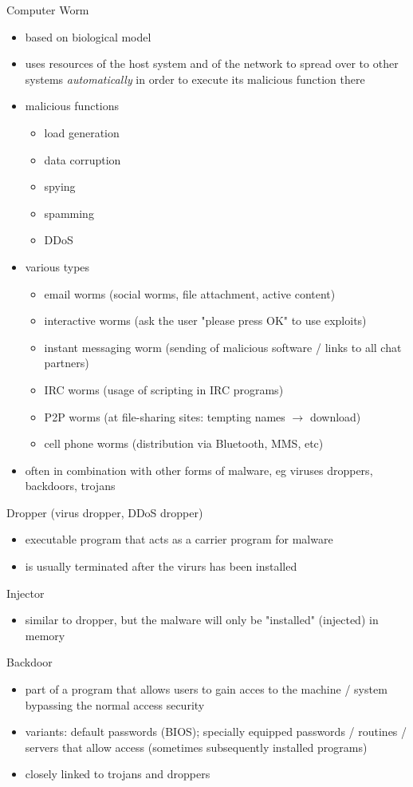 \documentclass[11pt]{article}
\begin{document}
Computer Worm
\begin{itemize}
\item based on biological model
\item uses resources of the host system and of the network to spread over to other systems \emph{automatically} in order to execute its malicious function there
\item malicious functions
\begin{itemize}
\item load generation
\item data corruption
\item spying
\item spamming
\item DDoS
\end{itemize}
\item various types
\begin{itemize}
\item email worms (social worms, file attachment, active content)
\item interactive worms (ask the user "please press OK" to use exploits)
\item instant messaging worm (sending of malicious software / links to all chat partners)
\item IRC worms (usage of scripting in IRC programs)
\item P2P worms (at file-sharing sites: tempting names \(\rightarrow\) download)
\item cell phone worms (distribution via Bluetooth, MMS, etc)
\end{itemize}
\item often in combination with other forms of malware, eg viruses droppers, backdoors, trojans
\end{itemize}

Dropper (virus dropper, DDoS dropper)
\begin{itemize}
\item executable program that acts as a carrier program for malware
\item is usually terminated after the virurs has been installed
\end{itemize}

Injector
\begin{itemize}
\item similar to dropper, but the malware will only be "installed" (injected) in memory
\end{itemize}

Backdoor
\begin{itemize}
\item part of a program that allows users to gain acces to the machine / system bypassing the normal access security
\item variants: default passwords (BIOS); specially equipped passwords / routines / servers that allow access (sometimes subsequently installed programs)
\item closely linked to trojans and droppers
\end{itemize}
\end{document}
